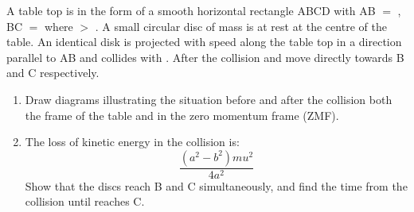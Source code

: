 
\begin{problem}[Discs on a Table]%
{A table top is in the form of a smooth horizontal rectangle ABCD with AB $=$ , BC $=$  where  $>$ . A small circular disc  of mass  is at rest at the centre of the table. An identical disk  is projected with speed  along the table top in a direction parallel to AB and collides with . After the collision  and  move directly towards B and C respectively.
\begin{enumerate}
	\item Draw diagrams illustrating the situation before and after the collision both the frame of the table and in the zero momentum frame (ZMF).
	\item The loss of kinetic energy in the collision is:
\begin{equation*}
\frac{(a^{2} - b^{2}) mu^{2}}{4a^{2}} 
\end{equation*}
Show that the discs reach B and C simultaneously, and find the time from the collision until  reaches C.
\end{enumerate}

}
\end{problem}
